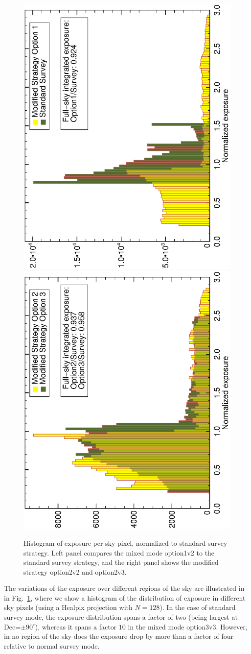 \documentclass[aps,prd,superscriptaddress,nofootinbib,fixlfloat, 12pt]{revtex4-1}
\begin{document}
\begin{figure}[t]
  \begin{center}
    \includegraphics[width=0.39\linewidth, angle=-90]{plots/option1_survey_hist.ps}
    \includegraphics[width=0.39\linewidth, angle=-90]{plots/option2_option3_hist.ps}
    \vspace{-0.5cm}
  \end{center}
  \caption{Histogram of exposure per sky pixel, normalized to standard survey
    strategy. Left panel compares the
    mixed mode option1v2 to the standard survey strategy, and the right panel
    shows the modified strategy option2v2 and option2v3.}
  \label{fig:expHisto}
\end{figure}

The variations of the exposure over different regions of the sky are
illustrated in in Fig.~\ref{fig:expHisto}, where we show a histogram of the
distribution of exposure in different sky pixels (using a Healpix projection
with $N=128$). In the case of standard survey mode, the exposure distribution
spans a factor of two (being largest at Dec=$\pm90^\circ$), whereas it
spans a factor $10$ in the mixed mode option3v3. However, in no region of the
sky does the exposure drop by more than a factor of four relative to normal
survey mode.
\end{document}
